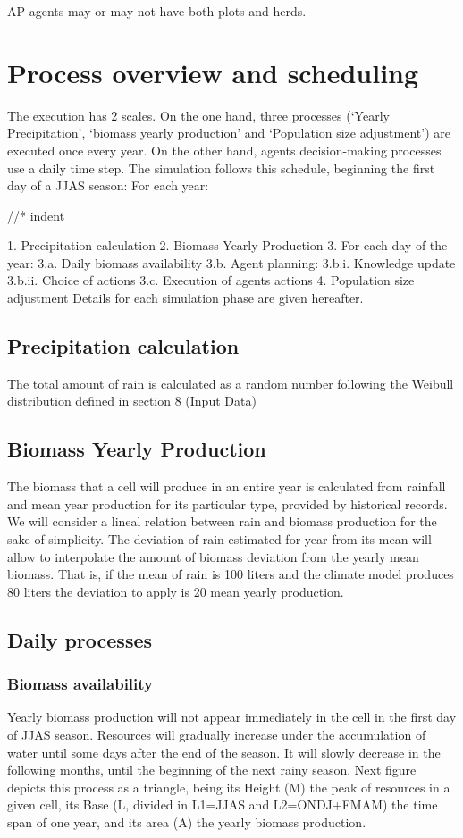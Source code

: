 AP agents may or may not have both plots and herds.


\section{Process overview and scheduling}
The execution has 2 scales. On the one hand, three processes (‘Yearly Precipitation’, ‘biomass yearly
production’ and ‘Population size adjustment’) are executed once every year. On the other hand,
agents decision-making processes use a daily time step. The simulation follows this schedule,
beginning the first day of a JJAS season:
For each year:

//* indent

1. Precipitation calculation
2. Biomass Yearly Production
3. For each day of the year:
3.a. Daily biomass availability
3.b. Agent planning:
3.b.i. Knowledge update
3.b.ii. Choice of actions
3.c. Execution of agents actions
4. Population size adjustment
Details for each simulation phase are given hereafter.


\subsection{Precipitation calculation}
The total amount of rain is calculated as a random number following the Weibull distribution defined in
section 8 (Input Data)
\subsection{Biomass Yearly Production}
The biomass that a cell will produce in an entire year is calculated from rainfall and mean year
production for its particular type, provided by historical records.
We will consider a lineal relation between rain and biomass production for the sake of simplicity. The
deviation of rain estimated for year from its mean will allow to interpolate the amount of biomass
deviation from the yearly mean biomass. That is, if the mean of rain is 100 liters and the climate model
produces 80 liters the deviation to apply is 20%
mean yearly production.

\subsection{Daily processes}

\subsubsection{Biomass availability}
Yearly biomass production will not appear immediately in the cell in the first day of JJAS season.
Resources will gradually increase under the accumulation of water until some days after the end of the
season. It will slowly decrease in the following months, until the beginning of the next rainy season.
Next figure depicts this process as a triangle, being its Height (M) the peak of resources in a given cell,
its Base (L, divided in L1=JJAS and L2=ONDJ+FMAM) the time span of one year, and its area (A) the
yearly biomass production.

